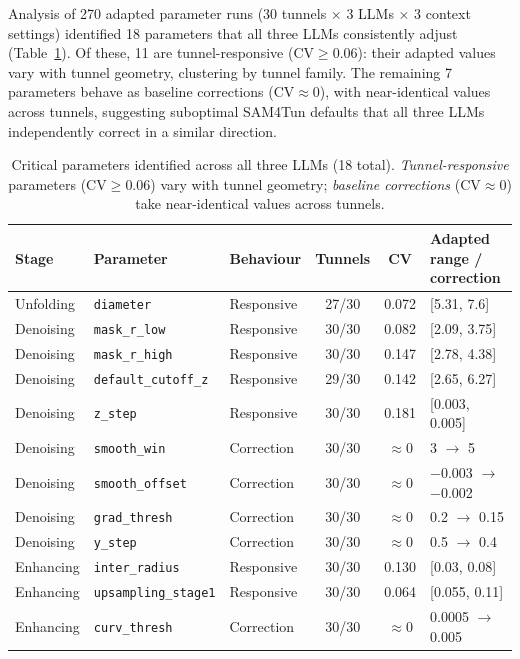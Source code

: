 \documentclass[a4paper,fleqn]{cas-dc}
\begin{document}
Analysis of 270 adapted parameter runs (30 tunnels × 3 LLMs × 3 context settings) identified 18 parameters that all three LLMs consistently adjust (Table~\ref{tab:critical-params}). Of these, 11 are tunnel-responsive ($\text{CV} \geq 0.06$): their adapted values vary with tunnel geometry, clustering by tunnel family. The remaining 7 parameters behave as baseline corrections ($\text{CV} \approx 0$), with near-identical values across tunnels, suggesting suboptimal SAM4Tun defaults that all three LLMs independently correct in a similar direction.

\begin{table}[t]
\caption{Critical parameters identified across all three LLMs (18 total). \emph{Tunnel-responsive} parameters ($\text{CV} \geq 0.06$) vary with tunnel geometry; \emph{baseline corrections} ($\text{CV} \approx 0$) take near-identical values across tunnels.}\label{tab:critical-params}
\begin{tabular*}{\textwidth}{@{\extracolsep{\fill}} l l l c c l @{}}
\toprule
Stage & Parameter & Behaviour & Tunnels & CV & Adapted range / correction \\
\midrule
Unfolding & \texttt{diameter} & Responsive & 27/30 & 0.072 & [5.31, 7.6] \\
\midrule
Denoising & \texttt{mask\_r\_low} & Responsive & 30/30 & 0.082 & [2.09, 3.75] \\
Denoising & \texttt{mask\_r\_high} & Responsive & 30/30 & 0.147 & [2.78, 4.38] \\
Denoising & \texttt{default\_cutoff\_z} & Responsive & 29/30 & 0.142 & [2.65, 6.27] \\
Denoising & \texttt{z\_step} & Responsive & 30/30 & 0.181 & [0.003, 0.005] \\
Denoising & \texttt{smooth\_win} & Correction & 30/30 & $\approx$0 & 3 $\rightarrow$ 5 \\
Denoising & \texttt{smooth\_offset} & Correction & 30/30 & $\approx$0 & $-$0.003 $\rightarrow$ $-$0.002 \\
Denoising & \texttt{grad\_thresh} & Correction & 30/30 & $\approx$0 & 0.2 $\rightarrow$ 0.15 \\
Denoising & \texttt{y\_step} & Correction & 30/30 & $\approx$0 & 0.5 $\rightarrow$ 0.4 \\
\midrule
Enhancing & \texttt{inter\_radius} & Responsive & 30/30 & 0.130 & [0.03, 0.08] \\
Enhancing & \texttt{upsampling\_stage1} & Responsive & 30/30 & 0.064 & [0.055, 0.11] \\
Enhancing & \texttt{curv\_thresh} & Correction & 30/30 & $\approx$0 & 0.0005 $\rightarrow$ 0.005 \\

\end{tabular*}
\end{table}
\end{document}

